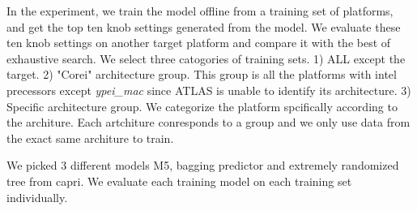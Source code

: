 In the experiment, we train the model offline from a training set of platforms, and get the top ten knob settings generated from the model.
We evaluate these ten knob settings on another target platform and compare it with the best of exhaustive search. We select 
three catogories of training sets. 1) ALL except the target. 2) "Corei" architecture group. This group is all the platforms 
with intel precessors except \textit{ypei\_mac} since ATLAS is unable to identify its architecture. 3) Specific architecture group.
We categorize the platform spcifically according to the architure. Each artchiture conresponds to a group and we only use data 
from the exact same architure to train. \par

We picked 3 different models M5, bagging predictor and extremely randomized tree from capri. We evaluate each training model on each training 
set individually.


